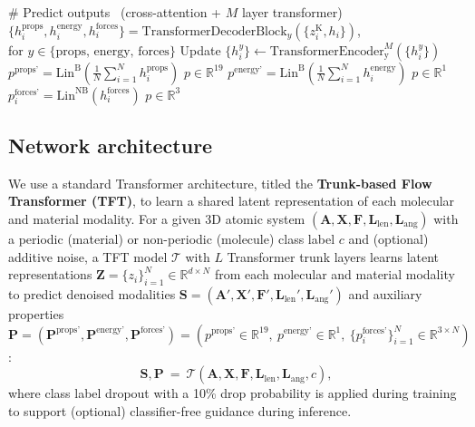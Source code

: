 \documentclass{article}
\theoremstyle{plain}
\theoremstyle{definition}
\theoremstyle{remark}
\begin{document}
\begin{algorithm}[tb]
\begin{algorithmic}[1]
  \item[] \textcolor{commentcolor}{\# Predict outputs \ (cross-attention + $M$ layer transformer)}
  \STATE $\{h_i^\text{props}, h_i^\text{energy}, h_i^\text{forces}\} = \text{TransformerDecoderBlock}_y(\{z_i^\text{K}, h_i\})$,
  \\ \hspace{1ex} for $y \in \{\text{props, energy, forces}\}$
  \STATE Update $\{h_i^y\} \leftarrow \text{TransformerEncoder}_\text{y}^M(\{h_i^y\})$
  \STATE $p^\text{props'} = \text{Lin}^\text{B}\left(\frac{1}{N} \sum_{i=1}^{N} h_i^\text{props}\right)$ \hfill $p \in \mathbb{R}^{19}$
  \STATE $p^\text{energy'} = \text{Lin}^\text{B}\left(\frac{1}{N} \sum_{i=1}^{N} h_i^\text{energy}\right)$ \hfill $p \in \mathbb{R}^1$
  \STATE $p_i^\text{forces'} = \text{Lin}^\text{NB}\left(h_i^\text{forces}\right)$ \hfill $p \in \mathbb{R}^3$
\end{algorithmic}
\end{algorithm}


\subsection{Network architecture}
\label{subsection:network_architecture}

We use a standard Transformer architecture, titled the \textbf{Trunk-based Flow Transformer (\textsc{TFT})}, to learn a shared latent representation of each molecular and material modality. For a given 3D atomic system $\left(\bm{A}, \bm{X}, \bm{F}, \bm{L}_\text{len}, \bm{L}_\text{ang}\right)$ with a periodic (material) or non-periodic (molecule) class label $c$ and (optional) additive noise, a \textsc{TFT} model $\mathcal{T}$ with $L$ Transformer trunk layers learns latent representations $\bm{Z} = \{z_i\}_{i=1}^N \in \mathbb{R}^{d \times N}$ from each molecular and material modality to predict denoised modalities
$\bm{S} = \left(\bm{A}', \bm{X}', \bm{F}', \bm{L}_\text{len}', \bm{L}_\text{ang}'\right)$
and auxiliary properties
$\bm{P} = \left(\bm{P}^\text{props'}, \bm{P}^\text{energy'}, \bm{P}^\text{forces'} \right) = \left(p^\text{props'} \in \mathbb{R}^{19},\ p^\text{energy'} \in \mathbb{R}^{1},\ \{p_i^\text{forces'}\}_{i=1}^N \in \mathbb{R}^{3 \times N} \right)$:
\begin{equation}
    \label{equation:tft_embeddings}
    \bm{S}, \bm{P}\ =\ \mathcal{T}\left(\bm{A}, \bm{X}, \bm{F}, \bm{L}_\text{len}, \bm{L}_\text{ang}, c\right),
\end{equation}
where class label dropout with a 10\% drop probability is applied during training to support (optional) classifier-free guidance during inference.
\end{document}
